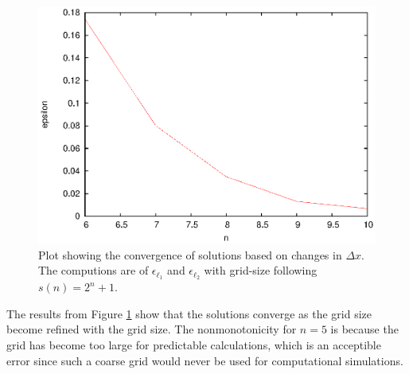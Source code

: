   \begin{figure}
    \centering
    \includegraphics{converge_spatial}
    \caption{Plot showing the convergence of solutions based on changes in $\Delta x$. The computions are of $\epsilon_{\ell_1}$ and $\epsilon_{\ell_2}$ with grid-size following $s(n) = 2^{n}+1$.}
    \label{fig:converge_spatial}
  \end{figure}

  The results from Figure \ref{fig:converge_spatial} show that the solutions converge as the grid size become refined with the grid size.
  The nonmonotonicity for $n = 5$ is because the grid has become too large for predictable calculations, which is an acceptible error since such a coarse grid would never be used for computational simulations.


